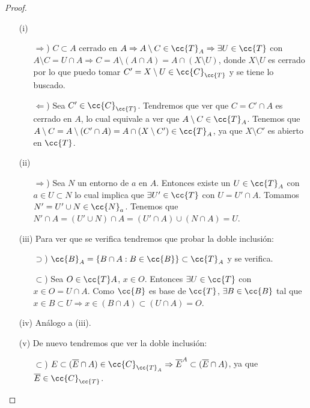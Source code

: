 \begin{prop}
    \begin{proof}\
        \begin{enumerate}
            \item[(i)] 
            \begin{itemize}
                \item[$\Rightarrow$)] $C\subset A$ cerrado en $A \Rightarrow A\setminus C \in \cc{T}_A \Rightarrow \exists U\in \cc{T}$ con $A\setminus C = U\cap A \Rightarrow C = A \setminus (A \cap A) = A\cap (X\setminus U)$, donde $X \setminus U$ es cerrado por lo que puedo tomar $C'=X\setminus U\in \cc{C}_{\cc{T}}$ y se tiene lo buscado.
                \item[$\Leftarrow$)] Sea $C' \in \cc{C}_{\cc{T}}$. Tendremos que ver que $C=C'\cap A$ es cerrado en $A$, lo cual equivale a ver que $A\setminus C\in \cc{T}_A$. Tenemos que $A\setminus C = A\setminus (C'\cap A) = A \cap (X\setminus C')\in \cc{T}_A$, ya que $X\setminus C'$ es abierto en $\cc{T}$.
            \end{itemize}
            \item[(ii)]
            \begin{itemize}
                \item[$\Rightarrow$)] Sea $N$ un entorno de $a$ en $A$. Entonces existe un $U\in \cc{T}_A$ con $a\in U\subset N$ lo cual implica que $\exists U'\in \cc{T}$ con $U=U'\cap A$. Tomamos $N'=U'\cup N \in \cc{N}_a$. Tenemos que $N'\cap A = (U'\cup N)\cap A = (U'\cap A) \cup (N\cap A) = U$.
            \end{itemize}
            \item[(iii)] Para ver que se verifica tendremos que probar la doble inclusión: 
            \begin{itemize}
                \item[$\supset$)] $\cc{B}_A = \{B\cap A : B\in \cc{B}\}\subset \cc{T}_A$ y se verifica.
                \item[$\subset$)] Sea $O\in \cc{T}A$, $x\in O$. Entonces $\exists U \in \cc{T}$ con $x\in O = U\cap A$. Como $\cc{B}$ es base de $\cc{T}$, $\exists B \in \cc{B}$ tal que $x\in B \subset U \Rightarrow x \in (B\cap A)\subset (U\cap A)=O$.
            \end{itemize}
            \item[(iv)] Análogo a (iii). %
            \item[(v)] De nuevo tendremos que ver la doble inclusión:
            \begin{itemize}
                \item[$\subset$)] $E\subset (\overline{E}\cap A) \in \cc{C}_{\cc{T}_A} \Rightarrow \overline{E}^A \subset (\overline{E}\cap A)$, ya que $\overline{E}\in \cc{C}_{\cc{T}}$.

\end{itemize}
\end{enumerate}
\end{proof}
\end{prop}
